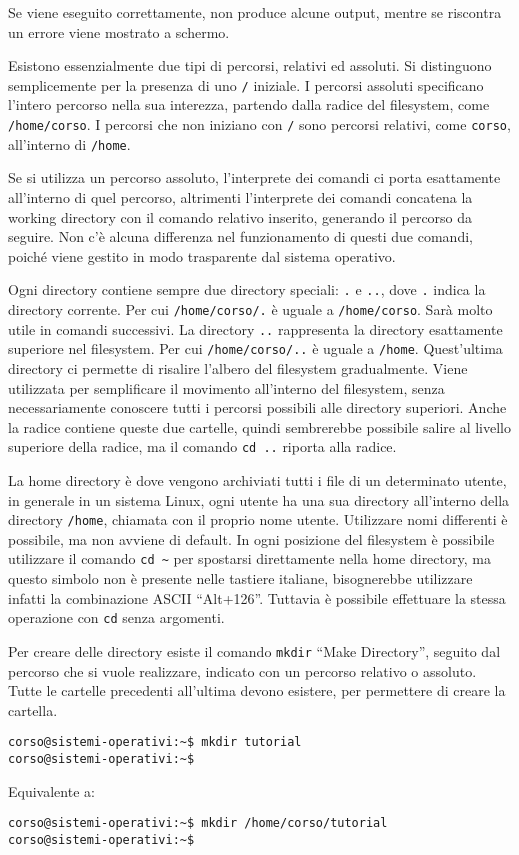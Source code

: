 \documentclass{article}
\numberwithin{equation}{subsection}
\begin{document}
Se viene eseguito correttamente, non produce alcune output, mentre se riscontra un errore viene mostrato a schermo. 


Esistono essenzialmente due tipi di percorsi, relativi ed assoluti. Si distinguono semplicemente per la presenza di uno \verb|/| iniziale. I percorsi assoluti specificano l'intero percorso nella sua interezza, 
partendo dalla radice del filesystem, come \verb|/home/corso|. I percorsi che non iniziano con \verb|/| sono percorsi relativi, come \verb|corso|, all'interno di \verb|/home|. 

Se si utilizza un percorso assoluto, l'interprete dei comandi ci porta esattamente all'interno di quel percorso, altrimenti l'interprete dei comandi concatena la working directory con il comando relativo inserito, 
generando il percorso da seguire. Non c'è alcuna differenza nel funzionamento di questi due comandi, poiché viene gestito in modo trasparente dal sistema operativo. 

Ogni directory contiene sempre due directory speciali: \verb|.| e \verb|..|, dove \verb|.| indica la directory corrente. Per cui \verb|/home/corso/.| è uguale a \verb|/home/corso|. Sarà molto utile in comandi 
successivi. La directory \verb|..| rappresenta la directory esattamente superiore nel filesystem. Per cui \verb|/home/corso/..| è uguale a \verb|/home|. 
Quest'ultima directory ci permette di risalire l'albero del filesystem gradualmente. Viene utilizzata per semplificare il movimento all'interno del filesystem, senza necessariamente conoscere tutti i percorsi 
possibili alle directory superiori. Anche la radice contiene queste due cartelle, quindi sembrerebbe possibile salire al livello superiore della radice, ma il comando \verb|cd ..| riporta alla radice. 

La home directory è dove vengono archiviati tutti i file di un determinato utente, in generale in un sistema Linux, ogni utente ha una sua directory all'interno della directory \verb|/home|, chiamata con il proprio 
nome utente. Utilizzare nomi differenti è possibile, ma non avviene di default. In ogni posizione del filesystem è possibile utilizzare il comando \verb|cd ~| per spostarsi direttamente nella home directory, ma 
questo simbolo non è presente nelle tastiere italiane, bisognerebbe utilizzare infatti la combinazione ASCII ``Alt+126''. Tuttavia è possibile effettuare la stessa operazione con \verb|cd| senza argomenti. 

Per creare delle directory esiste il comando \verb|mkdir| ``Make Directory'', seguito dal percorso che si vuole realizzare, indicato con un percorso relativo o assoluto. Tutte le cartelle precedenti all'ultima 
devono esistere, per permettere di creare la cartella.  
\begin{verbatim}
corso@sistemi-operativi:~$ mkdir tutorial
corso@sistemi-operativi:~$
\end{verbatim}
Equivalente a: 
\begin{verbatim}
corso@sistemi-operativi:~$ mkdir /home/corso/tutorial
corso@sistemi-operativi:~$
\end{verbatim}
\end{document}
